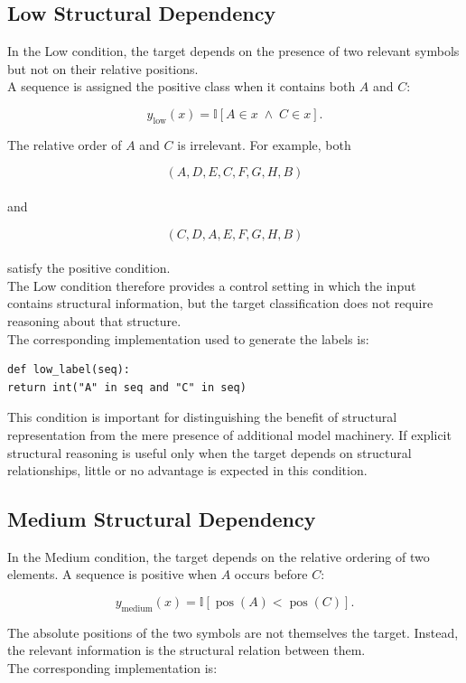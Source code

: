 \subsection{Low Structural Dependency}

\noindent
In the Low condition, the target depends on the presence of two relevant symbols but not on their relative positions.
\\
A sequence is assigned the positive class when it contains both $A$ and $C$:

$$
y_{\mathrm{low}}(x)
=
\mathbb{I}
\left[
A \in x \;\land\; C \in x
\right].
$$

\noindent
The relative order of $A$ and $C$ is irrelevant. For example, both

$$
(A,D,E,C,F,G,H,B)
$$
\\
and

$$
(C,D,A,E,F,G,H,B)
$$
\\
satisfy the positive condition.
\\
The Low condition therefore provides a control setting in which the input contains structural information, but the target classification does not require reasoning about that structure.
\\
The corresponding implementation used to generate the labels is:

\begin{verbatim}
def low_label(seq):
return int("A" in seq and "C" in seq)
\end{verbatim}

\noindent
This condition is important for distinguishing the benefit of structural representation from the mere presence of additional model machinery. If explicit structural reasoning is useful only when the target depends on structural relationships, little or no advantage is expected in this condition.

\subsection{Medium Structural Dependency}

\noindent
In the Medium condition, the target depends on the relative ordering of two elements. A sequence is positive when $A$ occurs before $C$:

$$
y_{\mathrm{medium}}(x)
=
\mathbb{I}
\left[
\operatorname{pos}(A) <
\operatorname{pos}(C)
\right].
$$

\noindent
The absolute positions of the two symbols are not themselves the target. Instead, the relevant information is the structural relation between them.
\\
The corresponding implementation is:

